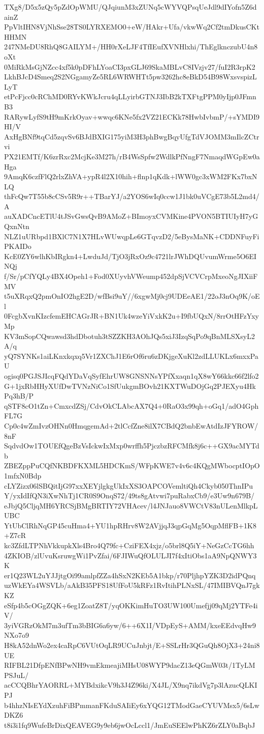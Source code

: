 TXg8/D5x5zQy5pZdOpWMU/QJqiunM3xZUNq5cWYVQPsqUeJdl9dIYofn5Z6dainZ
PpVltIHN8VjNhSse28TS0LYRXEMO0+eW/HAkr+Ufa/vkwWq2Cf2tmDkusCKtHHMN
247NMeDU8RhQ8GAILYM+/HH0rXeLJF4TfIEufXVNHlxhi/ThEglknczubU4n8oXt
0MiRkMsGjNZcc4xf5k0pDFhLYoaCI3pxGLJ69SkaMBLvC8IVzjv27/fuI2R3rpK2
LkhBJcD4Smeq2S2NGgamyZe5RL6WRWHTt5pw3262hc8eBkD54B98WxsvspizLLyT
etPcFjcc0cRChMD0RYvKWkJcru4qLLyirbGTNJ3IbB2kTXFtgPPM0yIjp0JFmnB3
RARywLyfS9tH9mKrkOyav+wwqc6KNe5fx2VZ21ECKk78HwbIvbmP/+sYMDI9HI/V
AxHgBNf9tqCd5zqvSv6BJdBXIG175yiM3H3phBwgBqyUfgTdVJOMM3mIlcZCtrvi
PX21EMTf/K6zrRxc2McjKe3M27h/rB4WsSpfw2WdlkPfNngF7NmaqdWGpEw0aHga
9AmqK6czfFlQ2rlxZhVA+ypR4l2X10hih+flnp1qKdk+lWW0gc3xWM2FKx7bxNLQ
thFcQw7T55b8cCSv5R9r++TBarYJ/a2YOS6wIq0ccw1J1bk0uVCgE73b5L2md4/A
auXADCncETlU4tJSvGwsQvB9AMoZ+BImoyxCVMKine4PVON5BTIUIyH7yGQxnNtn
NLZ1uURbpd1BXlC7N1X7HLvWUwqpLe6GTqvzD2/5eBysMaNK+CDDNFuyFiPKAIDo
KcE0ZY6wlhKbIRgkn4+LwduJd/TjO3jRxOz9c4721lrJWhDQUvumWrme5O6EINQj
f/Sr/pCfYQLy4BX4Opeh1+Fod0XUyvhVWeump452dpSjVCVCrpMxeoNgJIXiiFMV
t5uXRqxQ2pmOnIO2hgE2D/wfBsi9uY//6xgwMj0cj9UDEeAE1/22oJ3nOq9K/oEl
0FcgbXvnKIzcfemEHCAGrJR+BN1Uk4wzeYiVxkK2u+I9fbUQxN/8rrOtHFzYxyMp
KV3mSopCQwawsd3hdDbotuh3tSZZKH3AOhJQs5xiJ3IzqSqPo9qBnMLSXsyL2A/q
yQ7SYNKs1aiLKnxkqxq5Vr1ZXChJ1E6rOf6ru6zDKjgeXuKl2zdLLUKLx6mxxPaU
ogisq0PGJSJIcqFQdYDaVqSyfEhrUW8GNSNNsYPfXxaqn1qX8wY66kkc66f2lfo2
G+1jxRbHHyXUfDwTVNzNiCo1SfUukgmBOvh21KXTWuDOjGq2PJEXyu4HkPq3hB/P
qSTF8cO1tZn+CmxcdZSj/CdvOkCLAbcAX7Q4+0RaO3x99qh+oGq1/adO4GphFL7G
Cp0c4wZmIvzOHNn0HmqgemAd+2tlCcfZne8ilX7CBdQ2bnbEwAtdIzJFYROW/8nF
SqdvdOw1TOUEfQgeBzVsIckwIxMxp0wrffh5PjczbzRFCMfk8j6c++GX9acMYTdb
ZBEZppPuCQfNKBDFKXML5HDCKmS/WFpKWE7v4v6c4KQgMWbocptIOpO1mfxN0Bdp
cLYZizx06lSBQitIjG97xxXEYjlgkgUkIxXS3OAPCOVemltiQh4Ckyb050ThnIPu
Y/yxIdIfQN3iXwNhTj1CR0S9OnqS72/49ts8gAtvwi7puRabxCb9/e3Uw9n679B/
eJbjQ5CljqMH6YRCSjBMgBRTIY72VHAcev/l4JNJauo8VWCtV83nULenMlkpLUBC
YtUbClRhNqGP45cuHma4+YU1hpRHrv8W2AVjjqJ3qpGqMg5OqpMflFB+1K8+Z7cR
kc3ZfdLTPNhVkkupkXls4Bro4Q79fc+CziFEX4xjz/o5brl8Q5iY+NeGzCcTG6hh
4ZKIOB/zlUvuKsruwgWi1PvZfai/6FJIWuQfOLULJI7f4xItiObs1aA9NpQNWY3K
er1Q23WL2uYJJjtgOi99amlpfZZa4hSxN2KEb5A1bkp/r70PljhpYZK3D2idPQnq
uzWkEYa4WSVLb/aAkB35PFS18UfFoU5kRFz1RvItihPLNxSL/47IMIBVQnJ7gkKZ
eSfp4b5cOGgZQK+6eg1ZoatZ8T/yqOKKimHuTO3UW100Umefjj09qMj2YTFe4iV/
3yiVGRzOkM7m3ufTm3bBIG6a6yw/6++6X1I/VDpEyS+AMM/kxeEEdvqHw9NXo7o9
H8kA52dnWo2ex4caRpC6VUtOqLR9UCuJnbjt/E+SSLrHr3QGuQh8OjX3+24ni8UE
RIFBL21DfpENfBPwNH9vmEkmeajiMHsU08WYP9dacZ13eQGmW03t/1TyLMPSJuL/
acCCQBhrYAORRL+MYBdxikcV9h3J4Z96ki/X4JL/X9nq7ikdVg7p3lAzucQLKIPJ
b4hhzNIsEYdXzuhFiBPmmanFKduSAIiEy6xYQG12TModGaeCYUVMsx5/6sLwDKZ6
t8i3i1fq9WufeBrDixQEAVEG9y9eb6jwOcLccl1/JmEuSEElwPhKZ6rZLY0aBqbJ
